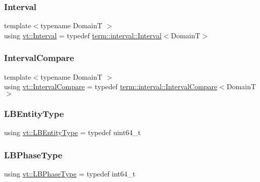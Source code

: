 \mbox{\label{namespacevt_a0036b5cb523aef3477d6d5de9d94eabb}} 
\subsubsection{\texorpdfstring{Interval}{Interval}}
{\footnotesize\ttfamily template$<$typename DomainT $>$ \\
using \hyperlink{namespacevt_a0036b5cb523aef3477d6d5de9d94eabb}{vt\+::\+Interval} = typedef \hyperlink{structvt_1_1term_1_1interval_1_1_interval}{term\+::interval\+::\+Interval}$<$DomainT$>$}

\mbox{\label{namespacevt_ab51b754f1d22841f555246195fab9d41}} 
\subsubsection{\texorpdfstring{Interval\+Compare}{IntervalCompare}}
{\footnotesize\ttfamily template$<$typename DomainT $>$ \\
using \hyperlink{namespacevt_ab51b754f1d22841f555246195fab9d41}{vt\+::\+Interval\+Compare} = typedef \hyperlink{structvt_1_1term_1_1interval_1_1_interval_compare}{term\+::interval\+::\+Interval\+Compare}$<$DomainT$>$}

\mbox{\label{namespacevt_a92ec26fb6644cd0ba7eb0ee70c96bee5}} 
\subsubsection{\texorpdfstring{L\+B\+Entity\+Type}{LBEntityType}}
{\footnotesize\ttfamily using \hyperlink{namespacevt_a92ec26fb6644cd0ba7eb0ee70c96bee5}{vt\+::\+L\+B\+Entity\+Type} = typedef uint64\+\_\+t}

\mbox{\label{namespacevt_a5505d0bab25ce2ff566a8e015871b379}} 
\subsubsection{\texorpdfstring{L\+B\+Phase\+Type}{LBPhaseType}}
{\footnotesize\ttfamily using \hyperlink{namespacevt_a5505d0bab25ce2ff566a8e015871b379}{vt\+::\+L\+B\+Phase\+Type} = typedef int64\+\_\+t}

